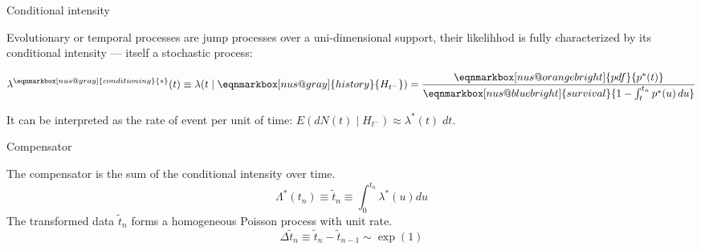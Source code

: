 \documentclass[
  ignorenonframetext,
  aspectratio=169,
  xcolor={dvipsnames,rgb}
]{beamer}
\begin{document}



\begin{frame}{Conditional intensity}

Evolutionary or temporal processes are jump processes over a uni-dimensional support, their likelihhod is fully characterized by its conditional intensity --- itself a stochastic process:

\vspace{2em}

\[
  \lambda^{\eqnmarkbox[nus@gray]{conditioning}{\ast}} (t) \equiv \lambda(t \mid \eqnmarkbox[nus@gray]{history}{H_{t^-}}) = 
    \frac{
      \eqnmarkbox[nus@orangebright]{pdf}{p^\ast(t)}
    }{
      \eqnmarkbox[nus@bluebright]{survival}{1 - \int_{t}^{t_n} p^\ast(u) \, du}
    }
\]


\vspace{4em}

It can be interpreted as the rate of event per unit of time: \( E(dN(t) \mid H_{t^-}) \approx \lambda^\ast(t) \; dt \). 

\end{frame}

\begin{frame}{Compensator}

The compensator is the sum of the conditional intensity over time.
\[
  \Lambda^\ast (t_n) \equiv \tilde{t}_n \equiv \int_0^{t_n} \lambda^\ast (u) du
\]
The transformed data \( \tilde{t}_n \) forms a homogeneous Poisson process with unit rate.
\[
  \Delta \tilde{t}_n \equiv \tilde{t}_n - \tilde{t}_{n-1} \sim \exp(1)
\]

\end{frame}
\end{document}
